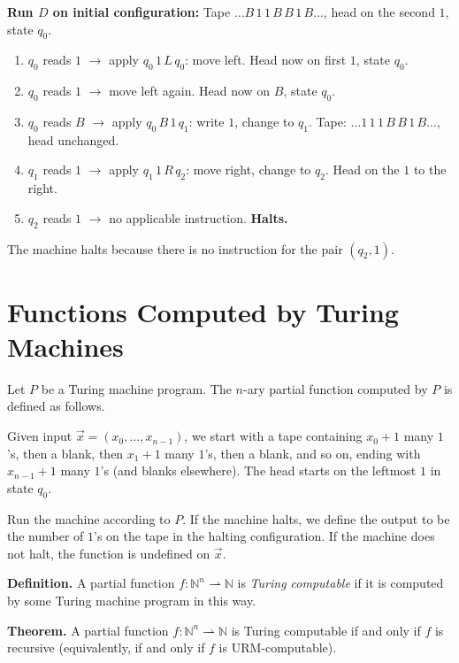 \documentclass[11pt]{article}
\begin{document}
\textbf{Run $D$ on initial configuration:} Tape $\ldots B \, 1 \, 1 \, B \, B \, 1 \, B \ldots$, head on the second $1$, state $q_0$.

\begin{enumerate}[leftmargin=1.8em, label=\arabic*)]
    \item $q_0$ reads $1$ $\to$ apply $q_0 \, 1 \, L \, q_0$: move left. Head now on first $1$, state $q_0$.
    \item $q_0$ reads $1$ $\to$ move left again. Head now on $B$, state $q_0$.
    \item $q_0$ reads $B$ $\to$ apply $q_0 \, B \, 1 \, q_1$: write $1$, change to $q_1$. Tape: $\ldots 1 \, 1 \, 1 \, B \, B \, 1 \, B \ldots$, head unchanged.
    \item $q_1$ reads $1$ $\to$ apply $q_1 \, 1 \, R \, q_2$: move right, change to $q_2$. Head on the $1$ to the right.
    \item $q_2$ reads $1$ $\to$ no applicable instruction. \textbf{Halts.}
\end{enumerate}

The machine halts because there is no instruction for the pair $(q_2, 1)$.

\section{Functions Computed by Turing Machines}

Let $P$ be a Turing machine program. The $n$-ary partial function computed by $P$ is defined as follows.

Given input $\vec{x} = (x_0, \ldots, x_{n-1})$, we start with a tape containing $x_0+1$ many $1$'s, then a blank, then $x_1+1$ many $1$'s, then a blank, and so on, ending with $x_{n-1}+1$ many $1$'s (and blanks elsewhere). The head starts on the leftmost $1$ in state $q_0$.

Run the machine according to $P$. If the machine halts, we define the output to be the number of $1$'s on the tape in the halting configuration. If the machine does not halt, the function is undefined on $\vec{x}$.

\textbf{Definition.} A partial function $f\colon \mathbb{N}^n \rightharpoonup \mathbb{N}$ is \emph{Turing computable} if it is computed by some Turing machine program in this way.

\textbf{Theorem.} A partial function $f\colon \mathbb{N}^n \rightharpoonup \mathbb{N}$ is Turing computable if and only if $f$ is recursive (equivalently, if and only if $f$ is URM-computable).
\end{document}
